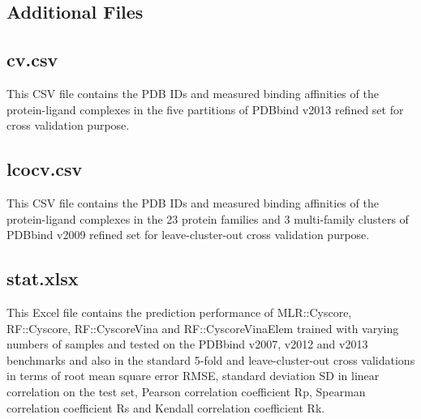 \documentclass[linenumbers]{bmcart}
\begin{document}
\begin{backmatter}

\section*{Additional Files}

\subsection*{cv.csv}
This CSV file contains the PDB IDs and measured binding affinities of the protein-ligand complexes in the five partitions of PDBbind v2013 refined set for cross validation purpose.

\subsection*{lcocv.csv}
This CSV file contains the PDB IDs and measured binding affinities of the protein-ligand complexes in the 23 protein families and 3 multi-family clusters of PDBbind v2009 refined set for leave-cluster-out cross validation purpose.

\subsection*{stat.xlsx}
This Excel file contains the prediction performance of MLR::Cyscore, RF::Cyscore, RF::CyscoreVina and RF::CyscoreVinaElem trained with varying numbers of samples and tested on the PDBbind v2007, v2012 and v2013 benchmarks and also in the standard 5-fold and leave-cluster-out cross validations in terms of root mean square error RMSE, standard deviation SD in linear correlation on the test set, Pearson correlation coefficient Rp, Spearman correlation coefficient Rs and Kendall correlation coefficient Rk.

\end{backmatter}
\end{document}
